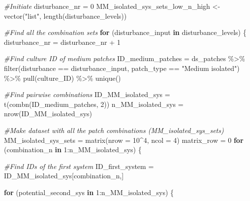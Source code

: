 \documentclass[
]{article}
\newenvironment{Shaded}{\begin{snugshade}}{\end{snugshade}}
\newcommand{\AttributeTok}[1]{\textcolor[rgb]{0.77,0.63,0.00}{#1}}
\newcommand{\CommentTok}[1]{\textcolor[rgb]{0.56,0.35,0.01}{\textit{#1}}}
\newcommand{\ControlFlowTok}[1]{\textcolor[rgb]{0.13,0.29,0.53}{\textbf{#1}}}
\newcommand{\DecValTok}[1]{\textcolor[rgb]{0.00,0.00,0.81}{#1}}
\newcommand{\FunctionTok}[1]{\textcolor[rgb]{0.00,0.00,0.00}{#1}}
\newcommand{\NormalTok}[1]{#1}
\newcommand{\OtherTok}[1]{\textcolor[rgb]{0.56,0.35,0.01}{#1}}
\newcommand{\SpecialCharTok}[1]{\textcolor[rgb]{0.00,0.00,0.00}{#1}}
\newcommand{\StringTok}[1]{\textcolor[rgb]{0.31,0.60,0.02}{#1}}
\begin{document}
\begin{Shaded}
\begin{Highlighting}[]
\CommentTok{\#Initiate}
\NormalTok{disturbance\_nr }\OtherTok{=} \DecValTok{0}
\NormalTok{MM\_isolated\_sys\_sets\_low\_n\_high }\OtherTok{\textless{}{-}} \FunctionTok{vector}\NormalTok{(}\StringTok{"list"}\NormalTok{, }
                                      \FunctionTok{length}\NormalTok{(disturbance\_levels))}

\CommentTok{\#Find all the combination sets }
\ControlFlowTok{for}\NormalTok{ (disturbance\_input }\ControlFlowTok{in}\NormalTok{ disturbance\_levels) \{}
\NormalTok{  disturbance\_nr }\OtherTok{=}\NormalTok{ disturbance\_nr }\SpecialCharTok{+} \DecValTok{1}
  
  \CommentTok{\#Find culture ID of medium patches}
\NormalTok{  ID\_medium\_patches }\OtherTok{=}\NormalTok{ ds\_patches }\SpecialCharTok{\%\textgreater{}\%}
    \FunctionTok{filter}\NormalTok{(disturbance }\SpecialCharTok{==}\NormalTok{ disturbance\_input,}
\NormalTok{           patch\_type }\SpecialCharTok{==} \StringTok{"Medium isolated"}\NormalTok{) }\SpecialCharTok{\%\textgreater{}\%}
    \FunctionTok{pull}\NormalTok{(culture\_ID) }\SpecialCharTok{\%\textgreater{}\%}
    \FunctionTok{unique}\NormalTok{()}
  
  \CommentTok{\#Find pairwise combinations}
\NormalTok{  ID\_MM\_isolated\_sys }\OtherTok{=} \FunctionTok{t}\NormalTok{(}\FunctionTok{combn}\NormalTok{(ID\_medium\_patches, }\DecValTok{2}\NormalTok{))}
\NormalTok{  n\_MM\_isolated\_sys }\OtherTok{=} \FunctionTok{nrow}\NormalTok{(ID\_MM\_isolated\_sys)}
  
  \CommentTok{\#Make dataset with all the patch combinations (MM\_isolated\_sys\_sets)}
\NormalTok{  MM\_isolated\_sys\_sets }\OtherTok{=} \FunctionTok{matrix}\NormalTok{(}\AttributeTok{nrow =} \DecValTok{10}\SpecialCharTok{\^{}}\DecValTok{4}\NormalTok{,}
                                \AttributeTok{ncol =} \DecValTok{4}\NormalTok{)}
\NormalTok{  matrix\_row }\OtherTok{=} \DecValTok{0}
  \ControlFlowTok{for}\NormalTok{ (combination\_n }\ControlFlowTok{in} \DecValTok{1}\SpecialCharTok{:}\NormalTok{n\_MM\_isolated\_sys) \{}
    
    \CommentTok{\#Find IDs of the first system }
\NormalTok{    ID\_first\_system }\OtherTok{=}\NormalTok{ ID\_MM\_isolated\_sys[combination\_n,]}
    
    \ControlFlowTok{for}\NormalTok{ (potential\_second\_sys }\ControlFlowTok{in} \DecValTok{1}\SpecialCharTok{:}\NormalTok{n\_MM\_isolated\_sys) \{}
      

\end{Highlighting}
\end{Shaded}
\end{document}
